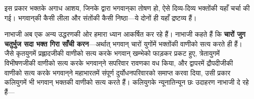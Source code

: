\begin{sloppypar}\justifying{}
इस प्रकार भक्तके अगाध आशय, जिनके द्वारा भगवान्‌का तोषण हो, ऐसे दिव्य-दिव्य भक्तोंकी यहाँ चर्चा की गई। भगवान्‌की कैसी लीला और संतोंकी कैसी निष्ठा—ये दोनों ही यहाँ द्रष्टव्य हैं।
\end{sloppypar}
\begin{sloppypar}\justifying{}
नाभाजी अब एक अन्य उद्धरणकी ओर हमारा ध्यान आकर्षित कर रहे हैं। नाभाजी कहते हैं कि \textbf{चारों जुग चतुर्भुज सदा भक्त गिरा साँची करन}—अर्थात् भगवान् चारों युगोंमें भक्तोंकी वाणीको सत्य करते ही हैं। जैसे कृतयुगमें प्रह्लादजीकी वाणीको सत्य करके भगवान् खम्भेको फाड़कर प्रकट हुए, त्रेतायुगमें विभीषणजीकी वाणीको सत्य करके भगवान्‌ने सपरिवार रावणका वध किया, और द्वापरमें द्रौपदीजीकी वाणीको सत्य करके भगवान्‌ने महाभारतमें संपूर्ण दुर्योधन\-परिवारको समाप्त करवा दिया, उसी प्रकार कलियुगमें भी भगवान् भक्तकी वाणीको सत्य करते हैं। कलियुगके न्यूनातिन्यून छः उदाहरण नाभाजी दे रहे हैं—
\end{sloppypar}


